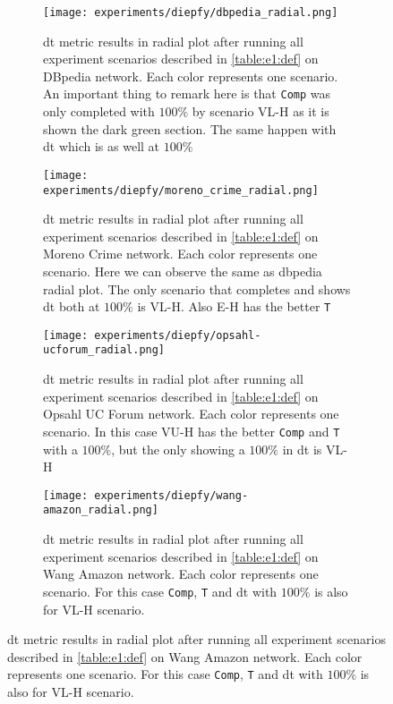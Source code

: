 \begin{figure}[!htp]
  \centering
  \begin{subfigure}[t]{0.45\textwidth}
  \texttt{[image: experiments/diepfy/dbpedia\_radial.png]}
    \caption[{[EE] \acrshort{dt} Results (Radial): \acrshort{dbpedia}}]{\acrshort{dt} metric results in radial plot after running all experiment scenarios described in \autoref{table:e1:def} on DBpedia network. Each color represents one scenario. An important thing to remark here is that \texttt{Comp} was only completed with $100\%$ by scenario VL-H as it is shown the dark green section. The same happen with \acrshort{dt} which is as well at $100\%$}
    \label{fig:dief:dbpedia-radial}
  \end{subfigure}\hfill
  \begin{subfigure}[t]{0.45\textwidth}
  \texttt{[image: experiments/diepfy/moreno\_crime\_radial.png]}
    \caption[{[EE] \acrshort{dt} Results (Radial): Moreno Crime}]{\acrshort{dt} metric results in radial plot after running all experiment scenarios described in \autoref{table:e1:def} on Moreno Crime network. Each color represents one scenario. Here we can observe the same as dbpedia radial plot. The only scenario that completes and shows \acrshort{dt} both at $100\%$ is VL-H. Also E-H has the better \texttt{T}}
    \label{fig:dief:moreno-radial}
  \end{subfigure}
  \vspace{0.5cm}
  \begin{subfigure}[t]{0.45\textwidth}
  \texttt{[image: experiments/diepfy/opsahl-ucforum\_radial.png]}
    \caption[{[EE] \acrshort{dt} Results (Radial): Opsahl UC Forum}]{\acrshort{dt} metric results in radial plot after running all experiment scenarios described in \autoref{table:e1:def} on Opsahl UC Forum network. Each color represents one scenario. In this case VU-H has the better \texttt{Comp} and \texttt{T} with a $100\%$, but the only showing a $100\%$ in \acrshort{dt} is VL-H}
    \label{fig:dief:opsahl-radial}
  \end{subfigure}\hfill
  \begin{subfigure}[t]{0.45\textwidth}
    \texttt{[image: experiments/diepfy/wang-amazon\_radial.png]}
    \caption[{[EE] \acrshort{dt} Results (Radial): Wang Amazon}]{\acrshort{dt} metric results in radial plot after running all experiment scenarios described in \autoref{table:e1:def} on Wang Amazon network. Each color represents one scenario. For this case \texttt{Comp}, \texttt{T} and \acrshort{dt} with $100\%$ is also for VL-H scenario.}

\end{subfigure}
\end{figure}
